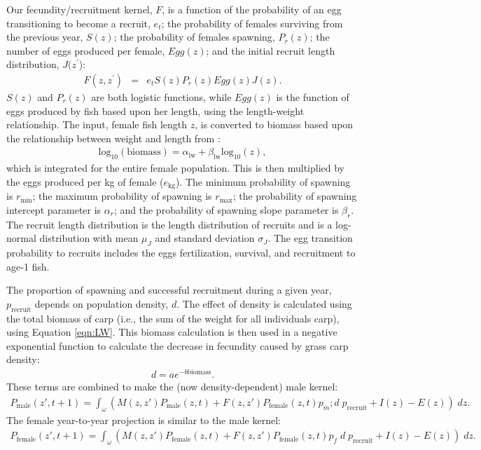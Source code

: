 \documentclass{article}[12pt]
\begin{document}
Our fecundity/recruitment kernel, \(F\), is a function of the probability of 
an egg transitioning to become a recruit, \(e_t\);
the probability of females surviving from the previous year, \(S(z)\);
the probability of females spawning, \(P_r(z)\);
the number of eggs produced per female, \(Egg(z)\); and 
the initial recruit length distribution, \(J(z^\prime\)):
\begin{eqnarray}
F(z, z^\prime) &=& e_t S(z) P_r(z) Egg(z) J(z).\label{eqn:Fec}
\end{eqnarray}
\(S(z)\) and \(P_r(z)\) are both logistic functions, while
\(Egg(z)\) is the function of eggs produced by fish based upon her length, using the length-weight relationship. 
The input, female fish length \(z\), is converted to biomass based upon the relationship between weight and length from \cite{wanner2009length}:
\begin{eqnarray}
\text{log}_{10} (\text{biomass}) = \alpha_{\text{lw}} + \beta_\text{lw}\text{log}_{10} (z)\label{eqn:LW},
\end{eqnarray}
which is integrated for the entire female population.
This is then multiplied by the eggs produced per kg of female (\(e_\text{kg}\)).  
The minimum probability of spawning is \(r_\text{min}\);
the maximum probability of spawning is \(r_\text{max}\);
the probability of spawning  intercept parameter is \(\alpha_r\);  and
the probability of spawning slope parameter is \(\beta_r\).
The recruit length distribution is the length distribution of recruits and is a log-normal distribution with mean \(\mu_J\) and standard deviation \(\sigma_J\).
The egg transition probability to recruits includes the eggs fertilization, survival, and recruitment to age-1 fish.

The proportion of spawning and successful recruitment during a given year, \(p_\text{recruit}\)  depends on population density, \(d\).  
The effect of density is calculated using the total biomass of carp (i.e., the sum of the weight for all individuals carp), using Equation \ref{eqn:LW}.  
This biomass calculation is then used in a negative exponential function to calculate the decrease in fecundity caused by grass carp density:
\begin{eqnarray}
d  = a e^{-b \text{biomass}}.
\end{eqnarray}
These terms are combined to make the (now density-dependent) male kernel:
\begin{eqnarray}
P_\text{male}(z', t + 1) = \int_\omega (M(z,z') P_\text{male}(z, t) + F(z,z') P_\text{female}(z, t) p_{m}; d \; p_\text{recruit} + I(z)  - E(z)) \; dz.
\end{eqnarray}
The female year-to-year projection is similar to the male kernel:
\begin{eqnarray}
P_\text{female}(z', t + 1) = \int_\omega (M(z,z') P_\text{female}(z, t) + F(z,z') P_\text{female}(z, t) p_{f}\; d \; p_\text{recruit} + I(z)  - E(z)) \; dz.\label{eqn:femaleEQN}
\end{eqnarray}
\end{document}
